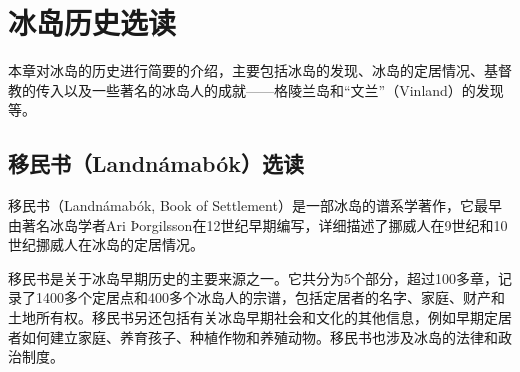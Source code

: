 \chapter{冰岛历史选读}
本章对冰岛的历史进行简要的介绍，主要包括冰岛的发现、冰岛的定居情况、基督教的传入以及一些著名的冰岛人的成就——格陵兰岛和“文兰”（Vinland）的发现等。

\section{移民书（Landnámabók）选读}
移民书（Landnámabók, Book of Settlement）是一部冰岛的谱系学著作，它最早由著名冰岛学者Ari Þorgilsson在12世纪早期编写，详细描述了挪威人在9世纪和10世纪挪威人在冰岛的定居情况。

移民书是关于冰岛早期历史的主要来源之一。它共分为5个部分，超过100多章，记录了1400多个定居点和400多个冰岛人的宗谱，包括定居者的名字、家庭、财产和土地所有权。移民书另还包括有关冰岛早期社会和文化的其他信息，例如早期定居者如何建立家庭、养育孩子、种植作物和养殖动物。移民书也涉及冰岛的法律和政治制度。

